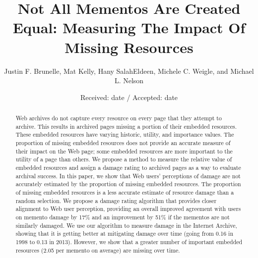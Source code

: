 %
%
%
%
%


\title{Not All Mementos Are Created Equal: Measuring The Impact Of Missing Resources}


\author{Justin F. Brunelle, Mat Kelly, Hany SalahEldeen, Michele C. Weigle, and Michael L. Nelson}

\date{Received: date / Accepted: date}


\maketitle
\begin{abstract}

Web archives do not capture every resource on every page that they attempt to archive. This results in archived pages missing a portion of their embedded resources. These embedded resources have varying historic, utility, and importance values. The proportion of missing embedded resources does not provide an accurate measure of their impact on the Web page; some embedded resources are more important to the utility of a page than others. We propose a method to measure the relative value of embedded resources and assign a damage rating to archived pages as a way to evaluate archival success. In this paper, we show that Web users' perceptions of damage are not accurately estimated by the proportion of missing embedded resources. The proportion of missing embedded resources is a less accurate estimate of resource damage than a random selection. We propose a damage rating algorithm that provides closer alignment to Web user perception, providing an overall improved agreement with users on memento damage by 17\% and an improvement by 51\% if the mementos are not similarly damaged. We use our algorithm to measure damage in the Internet Archive, showing that it is getting better at mitigating damage over time (going from 0.16 in 1998 to 0.13 in 2013). However, we show that a greater number of important embedded resources (2.05 per memento on average) are missing over time.  %

\end{abstract}


